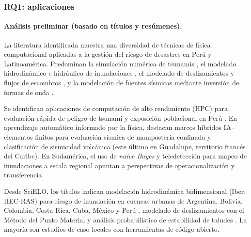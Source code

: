 \documentclass[12pt,a4paper]{article}
\begin{document}
\subsubsection{RQ1: aplicaciones}
\label{sec:rq1}
\paragraph*{Análisis preliminar (basado en títulos y resúmenes).}
La literatura identificada muestra una diversidad de técnicas de física computacional aplicadas a la gestión del riesgo de desastres en Perú y Latinoamérica. Predominan la simulación numérica de tsunamis \parencite{jimnez2023numerical, androsov2024nonlinear, davila2025probabilistic, garcia2025parallel}, el modelado hidrodinámico e hidráulico de inundaciones \parencite{fagundes2021sediment, fleischmann2021regional, escobarsilva2023assessing, saavedra2026impact}, el modelado de deslizamientos y flujos de escombros \parencite{marin2021assessing, ochoacornejo2025rock, meyrat2024simulating, flores2026numerical}, y la modelación de fuentes sísmicas mediante inversión de formas de onda \parencite{jimnez2021seismic, jimnez2021seismic2, moreno2025tsunami, jimenez2024numerical, jimenez2025numerical, jimnez2023seismic, jimnez2023seismic, jiang2023estimation}. 

Se identifican aplicaciones de computación de alto rendimiento (HPC) para evaluación rápida de peligro de tsunami y exposición poblacional en Perú \parencite{garcia2025parallel}. En aprendizaje automático informado por la física, destacan marcos híbridos IA--elementos finitos para evaluación sísmica de mampostería confinada \parencite{yupanqui2025hybrid} y clasificación de sismicidad volcánica \parencite{falcin2021machine} (este último en Guadalupe, territorio francés del Caribe). En Sudamérica, el uso de \textit{naive Bayes} y teledetección para mapeo de inundaciones a escala regional \parencite{kuchinski2025regional} apuntan a perspectivas de operacionalización y transferencia. 

Desde SciELO, los títulos indican modelación hidrodinámica bidimensional (Iber, HEC-RAS) para riesgo de inundación en cuencas urbanas de Argentina, Bolivia, Colombia, Costa Rica, Cuba, México y Perú \parencite{snchezpineda2025evaluaci, rojasguerrero2025lisis, la2025modelizaci, gutirrezgarca2022modelaci, watson2022case, zamora2021evaluaci, crdovalpez2021alternativas, crdovadehorta2021simulaci, garcaf2021integrando}, modelado de deslizamientos con el Método del Punto Material \parencite{lemus2024modelaci} y análisis probabilístico de estabilidad de taludes \parencite{ariasvalencia2024lisis}. La mayoría son estudios de caso locales con herramientas de código abierto.
\end{document}
